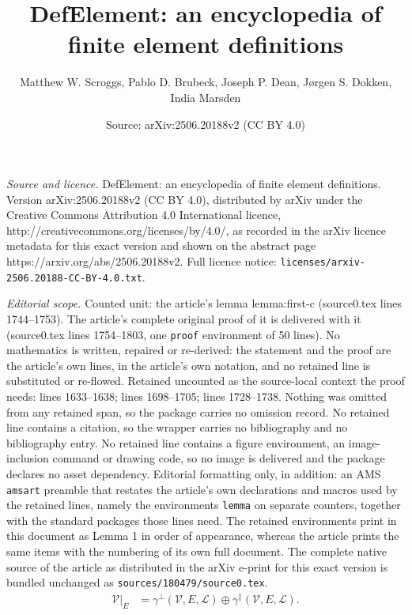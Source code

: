 \documentclass[10pt,a4paper]{amsart}
\title{DefElement: an encyclopedia of finite element definitions}
\author{Matthew W. Scroggs, Pablo D. Brubeck, Joseph P. Dean, J{\o}rgen S. Dokken, India Marsden}
\date{Source: arXiv:2506.20188v2 (CC BY 4.0)}
\newcommand{\ctrace}[3]{\gamma^\parallel(#1,#2,#3)}
\newcommand{\dualbasis}{\mathcal{L}}
\newcommand{\polyspace}{\mathcal{V}}
\newcommand{\subentity}{E}
\newcommand{\unctrace}[3]{\gamma^\perp(#1,#2,#3)}
\begin{document}
\maketitle

\noindent\emph{Source and licence.} DefElement: an encyclopedia of finite element definitions. Version arXiv:2506.20188v2 (CC BY 4.0), distributed by arXiv under the Creative Commons Attribution 4.0 International licence, http://creativecommons.org/licenses/by/4.0/, as recorded in the arXiv licence metadata for this exact version and shown on the abstract page https://arxiv.org/abs/2506.20188v2. Full licence notice: \texttt{licenses/arxiv-2506.20188-CC-BY-4.0.txt}.\par\smallskip

\noindent\textit{Editorial scope.} Counted unit: the article's lemma lemma:first-c (source0.tex lines 1744--1753). The article's complete original proof of it is delivered with it (source0.tex lines 1754--1803, one \texttt{proof} environment of 50 lines). No mathematics is written, repaired or re-derived: the statement and the proof are the article's own lines, in the article's own notation, and no retained line is substituted or re-flowed.  Retained uncounted as the source-local context the proof needs: lines 1633--1638; lines 1698--1705; lines 1728--1738.  Nothing was omitted from any retained span, so the package carries no omission record.  No retained line contains a citation, so the wrapper carries no bibliography and no bibliography entry.  No retained line contains a figure environment, an image-inclusion command or drawing code, so no image is delivered and the package declares no asset dependency.  Editorial formatting only, in addition: an AMS \texttt{amsart} preamble that restates the article's own declarations and macros used by the retained lines, namely the environments \texttt{lemma} on separate counters, together with the standard packages those lines need.  The retained environments print in this document as Lemma 1 in order of appearance, whereas the article prints the same items with the numbering of its own full document.  The complete native source of the article as distributed in the arXiv e-print for this exact version is bundled unchanged as \texttt{sources/180479/source0.tex}.
\begin{align}
\left.\polyspace\right|_{\subentity}
&=
\unctrace{\polyspace}{\subentity}{\dualbasis}\oplus\ctrace{\polyspace}{\subentity}{\dualbasis}.
\label{oplus}
\end{align}
\end{document}
